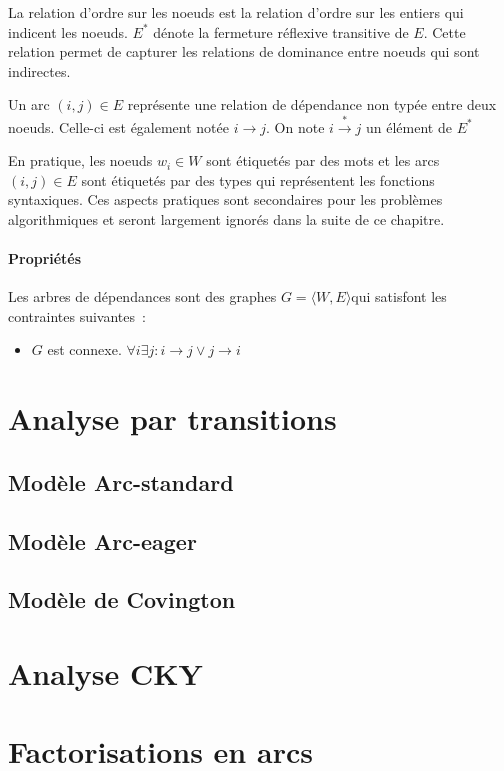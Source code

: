 \documentclass[11pt,openany]{book}
\begin{document}
La relation d'ordre sur les noeuds est la relation d'ordre sur les
entiers qui indicent les noeuds.
$E^*$ dénote la fermeture réflexive transitive de $E$. Cette relation
permet de capturer les relations de dominance entre noeuds qui sont indirectes.

Un arc $(i,j) \in E$ représente une relation de dépendance non typée entre
deux noeuds. Celle-ci est
également notée $i \rightarrow j$. 
On note $i\stackrel{*}{\rightarrow} j$ un élément de $E^*$

En pratique, les noeuds $w_i \in W$ sont étiquetés par des mots et les
arcs $(i,j) \in E$ sont étiquetés par des types qui représentent les
fonctions syntaxiques. Ces aspects pratiques sont secondaires pour les
problèmes algorithmiques et seront largement ignorés dans la suite de ce chapitre.


\paragraph{Propriétés}
Les arbres de dépendances sont des graphes $G = \langle W,E \rangle$qui satisfont les
contraintes suivantes~:
\begin{itemize}
\item $G$ est connexe. $\forall i \exists j :  i \rightarrow j \lor
  j\rightarrow i$
\end{itemize}









\section{Analyse par transitions}
\subsection{Modèle Arc-standard}
\subsection{Modèle Arc-eager}
\subsection{Modèle de Covington}

\section{Analyse CKY}
\section{Factorisations en arcs}
\end{document}
